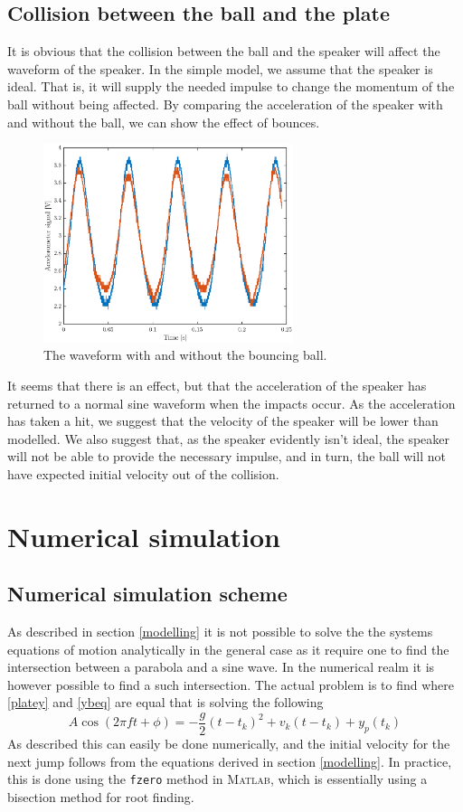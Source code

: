 \documentclass[12pt,oneside,a4paper]{article}
\numberwithin{equation}{section}
\begin{document}
{{{{\subsection{Collision between the ball and the plate}
It is obvious that the collision between the ball and the speaker will affect the waveform of the speaker. In the simple model, we assume that the speaker is ideal. That is, it will supply the needed impulse to change the momentum of the ball without being affected. By comparing the acceleration of the speaker with and without the ball, we can show the effect of bounces. 
\begin{figure}[h]
\centering
\includegraphics[width=0.65\textwidth]{ballanal.eps}
\caption{The waveform with and without the bouncing ball.}
\end{figure}
It seems that there is an effect, but that the acceleration of the speaker has returned to a normal sine waveform when the impacts occur. As the acceleration has taken a hit, we suggest that the velocity of the speaker will be lower than modelled. We also suggest that, as the speaker evidently isn't ideal, the speaker will not be able to provide the necessary impulse, and in turn, the ball will not have expected initial velocity out of the collision. 
\section{Numerical simulation}
\subsection{Numerical simulation scheme}
As described in section \ref{modelling} it is not possible to solve the the systems equations of motion analytically in the general case as it require one to find the intersection between a parabola and a sine wave. In the numerical realm it is however possible to find a such intersection. The actual problem is to find where \eqref{platey} and \eqref{ybeq} are equal that is solving the following
\begin{equation}
	A \cos(2\pi f t+ \phi) = -\frac{g}{2}(t-t_k)^2+v_k(t-t_k)+y_p(t_k)
\end{equation}
As described this can easily be done numerically, and the initial velocity for the next jump follows from the equations derived in section \ref{modelling}. In practice, this is done using the \texttt{fzero} method in \textsc{Matlab}, which is essentially using a bisection method for root finding.

}}}}
\end{document}
